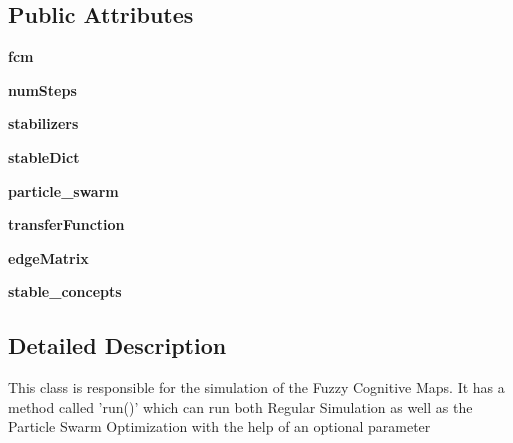 \subsection*{Public Attributes}
\begin{DoxyCompactItemize}
\item 
\hypertarget{class_simulation_1_1simulation_a671846c113f0a9dc83286c5ad9512285}{}\label{class_simulation_1_1simulation_a671846c113f0a9dc83286c5ad9512285} 
{\bfseries fcm}
\item 
\hypertarget{class_simulation_1_1simulation_a868424f7c18c88721f794fa099eadec7}{}\label{class_simulation_1_1simulation_a868424f7c18c88721f794fa099eadec7} 
{\bfseries num\+Steps}
\item 
\hypertarget{class_simulation_1_1simulation_aec4266415db730e604fd19efd35bef84}{}\label{class_simulation_1_1simulation_aec4266415db730e604fd19efd35bef84} 
{\bfseries stabilizers}
\item 
\hypertarget{class_simulation_1_1simulation_af0a20076b369e7b1917db3dcd5b77f60}{}\label{class_simulation_1_1simulation_af0a20076b369e7b1917db3dcd5b77f60} 
{\bfseries stable\+Dict}
\item 
\hypertarget{class_simulation_1_1simulation_a4feb4ed88fc1964a6174ae1b4e2cd51d}{}\label{class_simulation_1_1simulation_a4feb4ed88fc1964a6174ae1b4e2cd51d} 
{\bfseries particle\+\_\+swarm}
\item 
\hypertarget{class_simulation_1_1simulation_a0bf335dc7d60b29f151285ebfca3e665}{}\label{class_simulation_1_1simulation_a0bf335dc7d60b29f151285ebfca3e665} 
{\bfseries transfer\+Function}
\item 
\hypertarget{class_simulation_1_1simulation_a90288804c2a984095032eac0218bf92b}{}\label{class_simulation_1_1simulation_a90288804c2a984095032eac0218bf92b} 
{\bfseries edge\+Matrix}
\item 
\hypertarget{class_simulation_1_1simulation_a3c3e4f6c4750204ae65db87b36bd3533}{}\label{class_simulation_1_1simulation_a3c3e4f6c4750204ae65db87b36bd3533} 
{\bfseries stable\+\_\+concepts}
\end{DoxyCompactItemize}


\subsection{Detailed Description}
\begin{DoxyVerb}This class is responsible for the simulation of the Fuzzy Cognitive Maps.
It has a method called 'run()' which can run both Regular Simulation as
well as the Particle Swarm Optimization with the help of an optional parameter\end{DoxyVerb}
 

